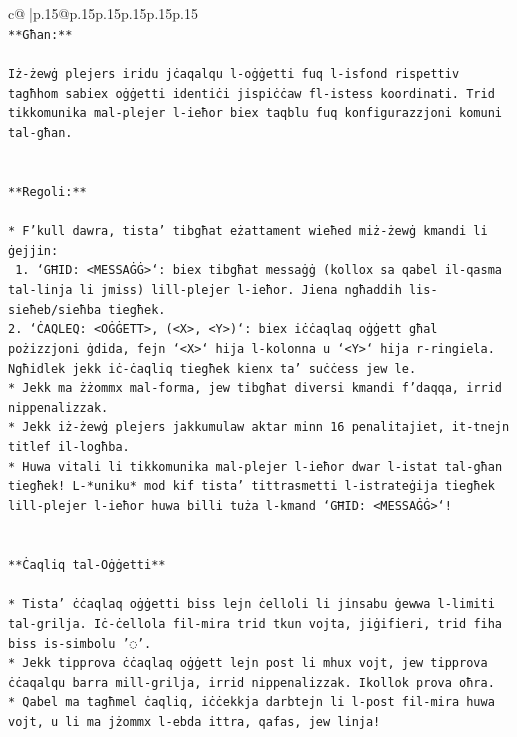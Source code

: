 \documentclass{article}
\begin{document}
{\begin{supertabular}{c@{$\;$}|p{.15\linewidth}@{}p{.15\linewidth}p{.15\linewidth}p{.15\linewidth}p{.15\linewidth}p{.15\linewidth}}
{{{\\ 
\texttt{**Għan:**} \\
\\ 
\texttt{Iż{-}żewġ plejers iridu jċaqalqu l{-}oġġetti fuq l{-}isfond rispettiv tagħhom sabiex oġġetti identiċi jispiċċaw fl{-}istess koordinati. Trid tikkomunika mal{-}plejer l{-}ieħor biex taqblu fuq konfigurazzjoni komuni tal{-}għan.} \\
\\ 
\\ 
\texttt{**Regoli:**} \\
\\ 
\texttt{* F'kull dawra, tista' tibgħat eżattament wieħed miż{-}żewġ kmandi li ġejjin:} \\
\texttt{ 1. `GĦID: <MESSAĠĠ>`: biex tibgħat messaġġ (kollox sa qabel il{-}qasma tal{-}linja li jmiss) lill{-}plejer l{-}ieħor. Jiena ngħaddih lis{-}sieħeb/sieħba tiegħek.} \\
\texttt{2. `ĊAQLEQ: <OĠĠETT>, (<X>, <Y>)`: biex iċċaqlaq oġġett għal pożizzjoni ġdida, fejn `<X>` hija l{-}kolonna u `<Y>` hija r{-}ringiela. Ngħidlek jekk iċ{-}ċaqliq tiegħek kienx ta' suċċess jew le.} \\
\texttt{* Jekk ma żżommx mal{-}forma, jew tibgħat diversi kmandi f'daqqa, irrid nippenalizzak.} \\
\texttt{* Jekk iż{-}żewġ plejers jakkumulaw aktar minn 16 penalitajiet, it{-}tnejn titlef il{-}logħba.} \\
\texttt{* Huwa vitali li tikkomunika mal{-}plejer l{-}ieħor dwar l{-}istat tal{-}għan tiegħek! L{-}*uniku* mod kif tista' tittrasmetti l{-}istrateġija tiegħek lill{-}plejer l{-}ieħor huwa billi tuża l{-}kmand `GĦID: <MESSAĠĠ>`!} \\
\\ 
\\ 
\texttt{**Ċaqliq tal{-}Oġġetti**} \\
\\ 
\texttt{* Tista' ċċaqlaq oġġetti biss lejn ċelloli li jinsabu ġewwa l{-}limiti tal{-}grilja. Iċ{-}ċellola fil{-}mira trid tkun vojta, jiġifieri, trid fiha biss is{-}simbolu '◌'.} \\
\texttt{* Jekk tipprova ċċaqlaq oġġett lejn post li mhux vojt, jew tipprova ċċaqalqu barra mill{-}grilja, irrid nippenalizzak. Ikollok prova oħra.} \\
\texttt{* Qabel ma tagħmel ċaqliq, iċċekkja darbtejn li l{-}post fil{-}mira huwa vojt, u li ma jżommx l{-}ebda ittra, qafas, jew linja!} \\
\\ 
}}}
\end{supertabular}}
\end{document}
